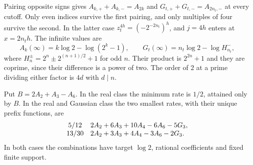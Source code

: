 \documentclass[11pt]{article}
\begin{document}
Pairing opposite signs gives $A_{k,+}+A_{k,-}=A_{2k}$ and
$G_{t,+}+G_{t,-}=A_{2n_t,-}$ at every cutoff. Only even indices survive the first pairing, and only multiples of four survive the second. In the latter case $z_t^{4h}=(-2^{-2n_t})^h$, and $j=4h$ enters at $x=2n_th$. The infinite values are
\[
 A_k(\infty)=k\log 2-\log(2^k-1),\qquad
 G_t(\infty)=n_t\log 2-\log H_{n_t}^{-},
\]
where $H_n^\pm=2^n\pm2^{(n+1)/2}+1$ for odd $n$. Their product is $2^{2n}+1$ and they are coprime, since their difference is a power of two. The order of $2$ at a prime dividing either factor is $4d$ with $d\mid n$.

\begin{theorem}\label{th:optimal}
Put $B=2A_2+A_3-A_6$. In the real class the minimum rate is $1/2$, attained only by $B$. In the real and Gaussian class the two smallest rates, with their unique prefix functions, are
\[
 \begin{array}{c@{\quad}l}
 5/12 & 2A_2+6A_3+10A_4-6A_6-5G_3,\\
 13/30 & 2A_2+3A_3+4A_4-3A_6-2G_3 .
 \end{array}
\]
In both cases the combinations have target $\log 2$, rational coefficients and fixed finite support.
\end{theorem}
\end{document}
